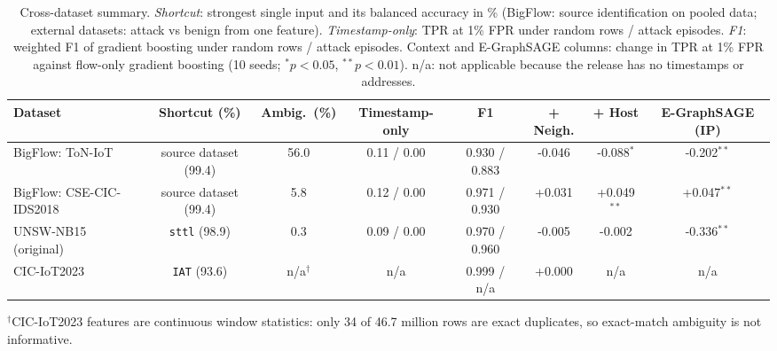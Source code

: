 \begin{table}[t]
\centering
\scriptsize
\caption{Cross-dataset summary. \emph{Shortcut}: strongest single input and its balanced accuracy in \% (BigFlow: source identification on pooled data; external datasets: attack vs benign from one feature). \emph{Timestamp-only}: TPR at 1\% FPR under random rows / attack episodes. \emph{F1}: weighted F1 of gradient boosting under random rows / attack episodes. Context and E-GraphSAGE columns: change in TPR at 1\% FPR against flow-only gradient boosting (10 seeds; $^{*}p<0.05$, $^{**}p<0.01$). n/a: not applicable because the release has no timestamps or addresses.}
\label{tab:external}
\begin{tabular}{lccccccc}
\toprule
Dataset & Shortcut (\%) & Ambig.\ (\%) & Timestamp-only & F1 & + Neigh. & + Host & E-GraphSAGE (IP) \\
\midrule
BigFlow: ToN-IoT & source dataset (99.4) & 56.0 & 0.11 / 0.00 & 0.930 / 0.883 & -0.046 & -0.088$^{*}$ & -0.202$^{**}$ \\
BigFlow: CSE-CIC-IDS2018 & source dataset (99.4) & 5.8 & 0.12 / 0.00 & 0.971 / 0.930 & +0.031 & +0.049$^{**}$ & +0.047$^{**}$ \\
UNSW-NB15 (original) & \texttt{sttl} (98.9) & 0.3 & 0.09 / 0.00 & 0.970 / 0.960 & -0.005 & -0.002 & -0.336$^{**}$ \\
CIC-IoT2023 & \texttt{IAT} (93.6) & n/a$^{\dagger}$ & n/a & 0.999 / n/a & +0.000 & n/a & n/a \\
\bottomrule
\end{tabular}
\par\smallskip\parbox{\linewidth}{\footnotesize $^{\dagger}$CIC-IoT2023 features are continuous window statistics: only 34 of 46.7 million rows are exact duplicates, so exact-match ambiguity is not informative.}
\end{table}
